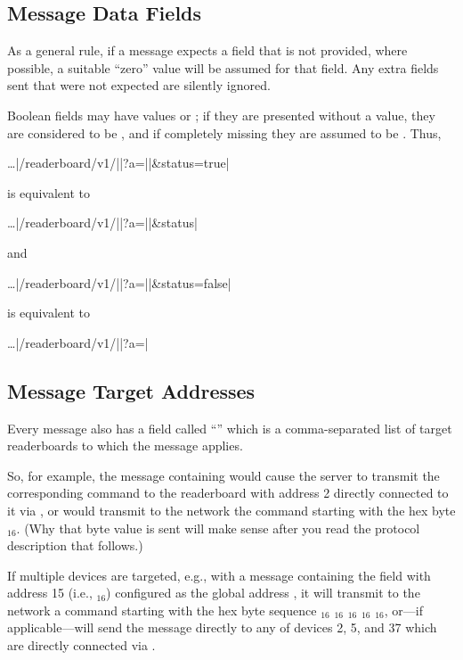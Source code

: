 \subsection{Message Data Fields}
As a general rule, if a message expects a field that is not provided, where possible, a suitable ``zero'' value will be assumed
for that field. Any extra fields sent that were not expected are silently ignored.

Boolean fields may have values  or ; if they are presented without a value, they are considered to be
, and if completely missing they are assumed to be . Thus,

\begin{Coding}
	\dots|/readerboard/v1/||?a=||&status=true|
\end{Coding}

\noindent is equivalent to

\begin{Coding}
	\dots|/readerboard/v1/||?a=||&status|
\end{Coding}

\noindent and

\begin{Coding}
	\dots|/readerboard/v1/||?a=||&status=false|
\end{Coding}

\noindent is equivalent to

\begin{Coding}
	\dots|/readerboard/v1/||?a=|
\end{Coding}

\subsection{Message Target Addresses}
Every message also has a field called ``'' which is a comma-separated list of target readerboards to which the message
applies.

So, for example, the message containing  would cause the server to transmit the corresponding command to the readerboard with address 2 directly connected to it via , or
would transmit to the  network the command starting with the hex byte $_{16}$. (Why that byte value is sent will make sense after you read the protocol
description that follows.)

If multiple devices are targeted, e.g., with a message containing the field  with address 15 (i.e., $_{16}$) configured as the global address ,
it will transmit to the  network a command starting with the hex byte sequence $_{16}$ $_{16}$ $_{16}$ $_{16}$ $_{16}$, or---if applicable---will send the message directly to any of devices 2, 5, and 37 which are directly connected via .

